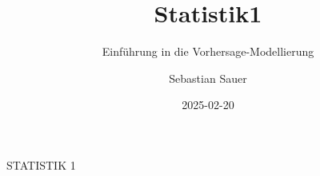 \documentclass[
  letterpaper,
  twoside,
  open=any]{scrbook}
\title{Statistik1}
\subtitle{Einführung in die Vorhersage-Modellierung}
\author{Sebastian Sauer}
\date{2025-02-20}
\theoremstyle{definition}
\theoremstyle{definition}
\theoremstyle{definition}
\theoremstyle{remark}
\begin{document}

  \begin{frontmatter}



\begin{titlepage}
    \centering
    \vspace*{5cm}
    {\Huge STATISTIK 1}
    \vfill
\end{titlepage}


\newpage
\null
\thispagestyle{empty} %
\newpage



\begin{titlepage}


\newcommand{\titlepagepagealign}{
\ifthenelse{\equal{center}{right}}{\raggedleft}{}
\ifthenelse{\equal{center}{center}}{\centering}{}
\ifthenelse{\equal{center}{left}}{\raggedright}{}
}


\newcommand{\titleandsubtitle}{
{\fontsize{30}{36.0}\selectfont
{\uppercase{\nohyphens{Statistik1}}}\par
}%

\vspace{\betweentitlesubtitle}
{
{\Large{\textit{\nohyphens{Einführung in die
Vorhersage-Modellierung}}}}\par
}}
\newcommand{\titlepagetitleblock}{
\rule{\textwidth}{0.4pt} %
\vspace{0.025\textheight} %

\titleandsubtitle

\vspace{0.025\textheight} 
\rule{0.3\textwidth}{0.4pt} %
}
\newcommand{\authorstyle}[1]{{\Large{#1}}}

\newcommand{\affiliationstyle}[1]{{\large{#1}}}

\newcommand{\titlepageauthorblock}{
{\authorstyle{\nohyphens{Sebastian Sauer}\\}}
}

\newcommand{\titlepageaffiliationblock}{
\hangindent=1em
\hangafter=1
{\affiliationstyle{


\vspace{1\baselineskip} 
}}
}
\newcommand{\headerstyled}{%
{}
}
\newcommand{\footerstyled}{%
{\large{\textsc{Sebastian Sauer\\
CC-BY-NC-ND-4.0\\
ISBN: 9798343798951\\
Independently published\\}}}
}
\newcommand{\datestyled}{%
{2025-02-20}
}



\end{titlepage}
\end{frontmatter}
\end{document}
